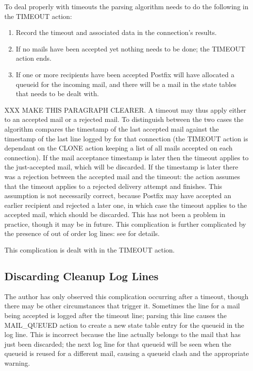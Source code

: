 To deal properly with timeouts the parsing algorithm needs to do the
following in the TIMEOUT action:

\begin{enumerate}

    \item Record the timeout and associated data in the connection's
        results.

    \item If no mails have been accepted yet nothing needs to be done; the
        TIMEOUT action ends.

    \item If one or more recipients have been accepted Postfix will have
        allocated a queueid for the incoming mail, and there will be a mail
        in the state tables that needs to be dealt with.

\end{enumerate}

XXX MAKE THIS PARAGRAPH CLEARER\@.  A timeout may thus apply either to an
accepted mail or a rejected mail.  To distinguish between the two cases the
algorithm compares the timestamp of the last accepted mail against the
timestamp of the last line logged by  for that connection
(the TIMEOUT action is dependant on the CLONE action keeping a list of all
mails accepted on each connection).  If the mail acceptance timestamp is
later then the timeout applies to the just-accepted mail, which will be
discarded.  If the  timestamp is later there was a rejection
between the accepted mail and the timeout: the action assumes that the
timeout applies to a rejected delivery attempt and finishes.  This
assumption is not necessarily correct, because Postfix may have accepted an
earlier recipient and rejected a later one, in which case the timeout
applies to the accepted mail, which should be discarded.  This has not been
a problem in practice, though it may be in future.  This complication is
further complicated by the presence of out of order  log
lines: see  for details.

This complication is dealt with in the TIMEOUT action.

\subsection{Discarding Cleanup Log Lines}

\label{discarding cleanup log lines}

The author has only observed this complication occurring after a timeout,
though there may be other circumstances that trigger it.  Sometimes the
 line for a mail being accepted is logged after the timeout
line; parsing this line causes the MAIL\_QUEUED action to create a new
state table entry for the queueid in the log line.  This is incorrect
because the line actually belongs to the mail that has just been discarded;
the next log line for that queueid will be seen when the queueid is reused
for a different mail, causing a queueid clash and the appropriate warning.

